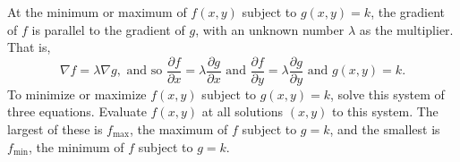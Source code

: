 {At the minimum or maximum of $f(x, y)$ subject to $g(x, y) = k$, the gradient of $f$ is
parallel to the gradient of $g$, with an unknown number $\lambda$ as the multiplier.  That is, 
$$\nabla f = \lambda \nabla g, \text{ and so } \frac{\partial f}{\partial x} = \lambda \frac{\partial g}{\partial x} \text{ and } \frac{\partial f}{\partial y} = \lambda \frac{\partial g}{\partial y} \text{ and } g(x,y) = k.$$
To minimize or maximize $f(x,y)$ subject to $g(x,y) = k$, solve this system of three equations. Evaluate $f(x,y)$ at all solutions $(x,y)$ to this system.  The largest of these is $f_{\text{max}}$, the maximum of $f$ subject to $g = k$, and the smallest is $f_{\text{min}}$, the minimum of $f$ subject to $g = k$.
}



